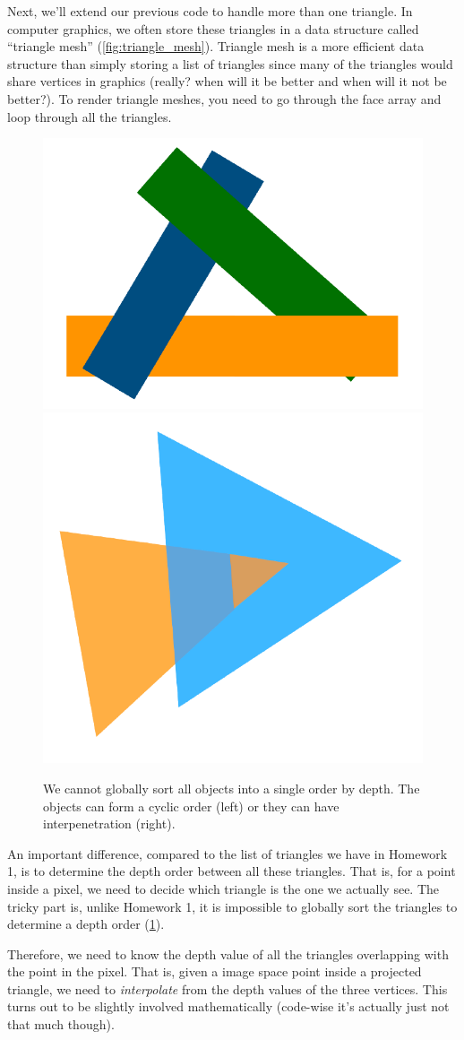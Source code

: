 Next, we'll extend our previous code to handle more than one triangle. In computer graphics, we often store these triangles in a data structure called ``triangle mesh'' (\cref{fig:triangle_mesh}). Triangle mesh is a more efficient data structure than simply storing a list of triangles since many of the triangles would share vertices in graphics (really? when will it be better and when will it not be better?). To render triangle meshes, you need to go through the face array and loop through all the triangles. 

\begin{figure}[h]
    \centering
    \includegraphics[width=0.4\linewidth]{imgs/cyclic.pdf}
    \includegraphics[width=0.4\linewidth]{imgs/interpenetration.pdf}
    \caption{We cannot globally sort all objects into a single order by depth. The objects can form a cyclic order (left) or they can have interpenetration (right).}
    \label{fig:depth_order}
\end{figure}

An important difference, compared to the list of triangles we have in Homework 1, is to determine the depth order between all these triangles. That is, for a point inside a pixel, we need to decide which triangle is the one we actually see. The tricky part is, unlike Homework 1, it is impossible to globally sort the triangles to determine a depth order (\cref{fig:depth_order}).

Therefore, we need to know the depth value of all the triangles overlapping with the point in the pixel. That is, given a image space point inside a projected triangle, we need to \emph{interpolate} from the depth values of the three vertices. This turns out to be slightly involved mathematically (code-wise it's actually just not that much though). 

